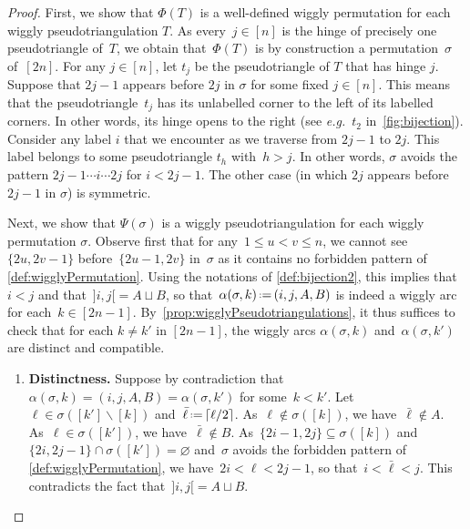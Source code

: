 \documentclass{amsart}
\theoremstyle{definition}
\newcommand{\ssm}{\smallsetminus} %
\newcommand{\eqdef}{\mbox{\,\raisebox{0.2ex}{\scriptsize\ensuremath{\mathrm:}}\ensuremath{=}\,}} %
\newcommand{\eg}{\textit{e.g.}~} %
\begin{document}
\begin{proof}
First, we show that \(\Phi(T)\) is a well-defined wiggly permutation for each wiggly pseudotriangulation \(T\).
As every~$j \in [n]$ is the hinge of precisely one pseudotriangle of~$T$, we obtain that~\(\Phi(T)\) is by construction a permutation~$\sigma$ of~$[2n]$.
For any \(j \in [n]\), let \(t_j\) be the pseudotriangle of \(T\) that has hinge \(j\).
Suppose that \(2j-1\) appears before \(2j\) in \(\sigma\) for some fixed \(j \in [n]\).
This means that the pseudotriangle~\(t_j\) has its unlabelled corner to the left of its labelled corners.
In other words, its hinge opens to the right (see \eg $t_2$ in~\cref{fig:bijection}).
Consider any label \(i\) that we encounter as we traverse from \(2j-1\) to \(2j\).
This label belongs to some pseudotriangle \(t_h\) with~$h > j$.
In other words, \(\sigma\) avoids the pattern \(2j-1 \cdots i \cdots 2j\) for \(i < 2j-1\).
The other case (in which \(2j\) appears before \(2j-1\) in \(\sigma\)) is symmetric.

Next, we show that \(\Psi(\sigma)\) is a wiggly pseudotriangulation for each wiggly permutation \(\sigma\).
Observe first that for any~$1 \le u < v \le n$, we cannot see~$\{2u, 2v-1\}$ before~$\{2u-1, 2v\}$ in~$\sigma$ as it contains no forbidden pattern of \cref{def:wigglyPermutation}.
Using the notations of \cref{def:bijection2}, this implies that~$i < j$ and that~${]i,j[} = A \sqcup B$, so that~$\alpha(\sigma,k) \eqdef (i, j, A, B)$ is indeed a wiggly arc for each~$k \in [2n-1]$.
By~\cref{prop:wigglyPseudotriangulations}, it thus suffices to check that for each \(k \neq k'\) in \([2n-1]\), the wiggly arcs 
\(\alpha(\sigma,k)\) and~\(\alpha(\sigma,k')\) are distinct and compatible.
\begin{enumerate}
\item \textbf{Distinctness.}
Suppose by contradiction that \(\alpha(\sigma,k) = (i,j,A,B) = \alpha(\sigma,k')\) for some~\({k < k'}\).
Let~${\ell \in \sigma([k'] \ssm [k])}$ and~$\bar\ell \eqdef \lceil \ell/2 \rceil$.
As~$\ell \notin \sigma([k])$, we have~$\bar\ell \notin A$.
As~$\ell \in \sigma([k'])$, we have~$\bar\ell \notin B$.
As~$\{2i-1, 2j\} \subseteq \sigma([k])$ and~$\{2i, 2j-1\} \cap \sigma([k']) = \varnothing$ and~$\sigma$ avoids the forbidden pattern of \cref{def:wigglyPermutation}, we have~$2i < \ell < 2j-1$, so that~$i < \bar\ell < j$.
This contradicts the fact that~${]i,j[} = A \sqcup B$.


\end{enumerate}
\end{proof}
\end{document}

